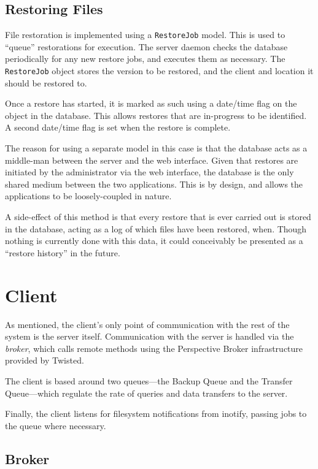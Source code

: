 \subsection{Restoring Files}
\label{sec:implementation-server-restoring}

File restoration is implemented using a \verb!RestoreJob! model. This is used
to ``queue'' restorations for execution. The server daemon checks the database
periodically for any new restore jobs, and executes them as necessary. The
\verb!RestoreJob! object stores the version to be restored, and the client and
location it should be restored to.

Once a restore has started, it is marked as such using a date/time flag on the
object in the database. This allows restores that are in-progress to be
identified. A second date/time flag is set when the restore is complete.

The reason for using a separate model in this case is that the database acts as
a middle-man between the server and the web interface. Given that restores are
initiated by the administrator via the web interface, the database is the only
shared medium between the two applications. This is by design, and allows the
applications to be loosely-coupled in nature.

A side-effect of this method is that every restore that is ever carried out is
stored in the database, acting as a log of which files have been restored,
when. Though nothing is currently done with this data, it could conceivably be
presented as a ``restore history'' in the future.

\section{Client}
\label{sec:implementation-client}

As mentioned, the client's only point of communication with the rest of the
system is the server itself. Communication with the server is handled via the
\emph{broker}, which calls remote methods using the Perspective Broker
infrastructure provided by Twisted.

The client is based around two queues---the Backup Queue and the Transfer
Queue---which regulate the rate of queries and data transfers to the server.

Finally, the client listens for filesystem notifications from inotify, passing
jobs to the queue where necessary.

\subsection{Broker}
\label{sec:implementation-client-broker}

